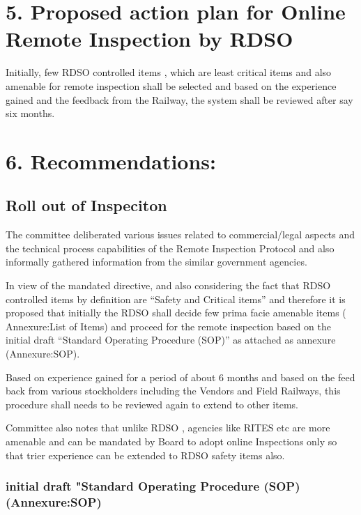 \documentclass[
]{article}
\begin{document}
\hypertarget{proposed-action-plan-for-online-remote-inspection-by-rdso}{%
\section{5. Proposed action plan for Online Remote Inspection by
RDSO}\label{proposed-action-plan-for-online-remote-inspection-by-rdso}}

Initially, few RDSO controlled items , which are least critical items
and also amenable for remote inspection shall be selected and based on
the experience gained and the feedback from the Railway, the system
shall be reviewed after say six months.

\hypertarget{recommendations}{%
\section{6. Recommendations:}\label{recommendations}}

\hypertarget{roll-out-of-inspeciton}{%
\subsection{Roll out of Inspeciton}\label{roll-out-of-inspeciton}}

The committee deliberated various issues related to commercial/legal
aspects and the technical process capabilities of the Remote Inspection
Protocol and also informally gathered information from the similar
government agencies.

In view of the mandated directive, and also considering the fact that
RDSO controlled items by definition are ``Safety and Critical items''
and therefore it is proposed that initially the RDSO shall decide few
prima facie amenable items ( Annexure:List of Items) and proceed for the
remote inspection based on the initial draft ``Standard Operating
Procedure (SOP)'' as attached as annexure (Annexure:SOP).

Based on experience gained for a period of about 6 months and based on
the feed back from various stockholders including the Vendors and Field
Railways, this procedure shall needs to be reviewed again to extend to
other items.

Committee also notes that unlike RDSO , agencies like RITES etc are more
amenable and can be mandated by Board to adopt online Inspections only
so that trier experience can be extended to RDSO safety items also.

\hypertarget{initial-draft-standard-operating-procedure-sop-annexuresop}{%
\subsubsection{initial draft "Standard Operating Procedure (SOP)
(Annexure:SOP)}\label{initial-draft-standard-operating-procedure-sop-annexuresop}}
\end{document}

